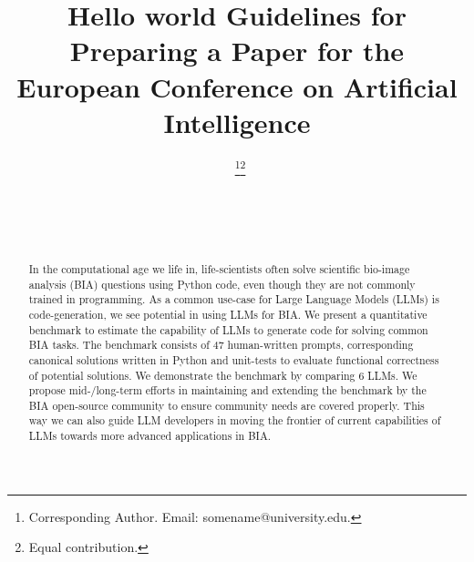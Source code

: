 \documentclass{ecai}
\begin{document}

\begin{frontmatter}




\title{Hello world Guidelines for Preparing a Paper for the \\
European Conference on Artificial Intelligence}


\author[A]{~\thanks{Corresponding Author. Email: somename@university.edu.}\footnote{Equal contribution.}}
\author[B]{~\footnotemark}
\author[B,C]{~} 

\address[A]{Short Affiliation of First Author}
\address[B]{Short Affiliation of Second Author and Third Author}
\address[C]{Short Alternate Affiliation of Third Author}


\begin{abstract}
In the computational age we life in, life-scientists often solve scientific bio-image analysis (BIA) questions using Python code, even though they are not commonly trained in programming. As a common use-case for Large Language Models (LLMs) is code-generation, we see potential in using LLMs for BIA. We present a quantitative benchmark to estimate the capability of LLMs to generate code for solving common BIA tasks. The benchmark consists of 47 human-written prompts, corresponding canonical solutions written in Python and unit-tests to evaluate functional correctness of potential solutions. We demonstrate the benchmark by comparing 6 LLMs. We propose mid-/long-term efforts in maintaining and extending the benchmark by the BIA open-source community to ensure community needs are covered properly. This way we can also guide LLM developers in moving the frontier of current capabilities of LLMs towards more advanced applications in BIA. 
\end{abstract}

\end{frontmatter}
\end{document}
